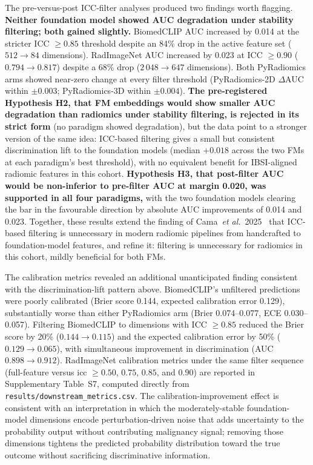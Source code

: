The pre-versus-post ICC-filter analyses produced two findings worth flagging. \textbf{Neither foundation model showed AUC degradation under stability filtering; both gained slightly.} BiomedCLIP AUC increased by 0.014 at the stricter ICC $\geq 0.85$ threshold despite an 84\% drop in the active feature set ($512 \rightarrow 84$ dimensions). RadImageNet AUC increased by 0.023 at ICC $\geq 0.90$ ($0.794 \rightarrow 0.817$) despite a 68\% drop ($2\,048 \rightarrow 647$ dimensions). Both PyRadiomics arms showed near-zero change at every filter threshold (PyRadiomics-2D $\Delta$AUC within $\pm 0.003$; PyRadiomics-3D within $\pm 0.004$). \textbf{The pre-registered Hypothesis H2, that FM embeddings would show smaller AUC degradation than radiomics under stability filtering, is rejected in its strict form} (no paradigm showed degradation), but the data point to a stronger version of the same idea: ICC-based filtering gives a small but consistent discrimination lift to the foundation models (median $+0.018$ across the two FMs at each paradigm's best threshold), with no equivalent benefit for IBSI-aligned radiomic features in this cohort. \textbf{Hypothesis H3, that post-filter AUC would be non-inferior to pre-filter AUC at margin 0.020, was supported in all four paradigms,} with the two foundation models clearing the bar in the favourable direction by absolute AUC improvements of 0.014 and 0.023. Together, these results extend the finding of Cama~\textit{et al.}~2025~\cite{cama2025} that ICC-based filtering is unnecessary in modern radiomic pipelines from handcrafted to foundation-model features, and refine it: filtering is unnecessary for radiomics in this cohort, mildly beneficial for both FMs.

The calibration metrics revealed an additional unanticipated finding consistent with the discrimination-lift pattern above. BiomedCLIP's unfiltered predictions were poorly calibrated (Brier score 0.144, expected calibration error 0.129), substantially worse than either PyRadiomics arm (Brier 0.074--0.077, ECE 0.030--0.057). Filtering BiomedCLIP to dimensions with ICC $\geq 0.85$ reduced the Brier score by 20\% ($0.144 \rightarrow 0.115$) and the expected calibration error by 50\% ($0.129 \rightarrow 0.065$), with simultaneous improvement in discrimination (AUC $0.898 \rightarrow 0.912$). RadImageNet calibration metrics under the same filter sequence (full-feature versus icc $\geq 0.50$, $0.75$, $0.85$, and $0.90$) are reported in Supplementary Table~S7, computed directly from \texttt{results/downstream\_metrics.csv}. The calibration-improvement effect is consistent with an interpretation in which the moderately-stable foundation-model dimensions encode perturbation-driven noise that adds uncertainty to the probability output without contributing malignancy signal; removing those dimensions tightens the predicted probability distribution toward the true outcome without sacrificing discriminative information.

